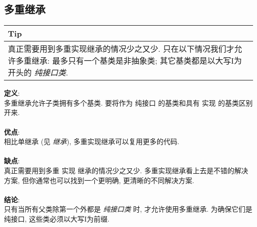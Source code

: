 \documentclass[a4paper,11pt,CJK]{article}
\begin{document}
\begin{CJK}{UTF8}{gbsn}
\subsection{多重继承}
\begin{table}[htbp]
\flushleft
\begin{tabular}{p{400pt}}
\toprule
\rowcolor[gray]{.8} Tip \\
\midrule
真正需要用到多重实现继承的情况少之又少. 只在以下情况我们才允许多重继承: 最多只有一个基类是非抽象类; 其它基类都是以大写I为开头的 \emph{纯接口类}.\\
\bottomrule
\end{tabular}
\end{table}
\noindent
\textbf{定义}:\\
\indent 多重继承允许子类拥有多个基类. 要将作为 纯接口 的基类和具有 实现 的基类区别开来.\\
\\
\textbf{优点}:\\
\indent 相比单继承 (见 \emph{继承}), 多重实现继承可以复用更多的代码.\\
\\
\textbf{缺点}:\\
\indent 真正需要用到多重 实现 继承的情况少之又少. 多重实现继承看上去是不错的解决方案, 但你通常也可以找到一个更明确, 更清晰的不同解决方案.\\
\\
\textbf{结论}:\\
\indent 只有当所有父类除第一个外都是 \emph{纯接口类} 时, 才允许使用多重继承. 为确保它们是纯接口, 这些类必须以大写I为前缀. \\

\end{CJK}
\end{document}
